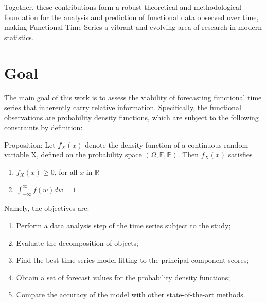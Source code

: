 \documentclass[article]{abntex2}
\begin{document}
Together, these contributions form a robust theoretical and methodological foundation for the analysis and prediction of functional data observed over time, making Functional Time Series a vibrant and evolving area of research in modern statistics.





\section{Goal}
The main goal of this work is to assess the viability of forecasting functional time series that inherently carry relative information. Specifically, the functional observations are probability density functions, which are subject to the following constraints by definition:

Proposition: Let $f_X(x)$ denote the density function of a continuous random variable X,  defined on the probability space $(\Omega, \mathbb{F}, \mathbb{P})$. Then $f_X(x)$ satisfies
\begin{enumerate}
    \item $f_X(x)\geq0$, for all $x$ in $\mathbb{R}$
    \item $\int_{-\infty}^{\infty}f(w)dw=1$
\end{enumerate}

Namely, the objectives are:
\begin{enumerate}
    \item Perform a data analysis step of the time series subject to the study;
    \item Evaluate the decomposition of objects;
    \item Find the best time series model fitting to the principal component scores;
    \item Obtain a set of forecast values for the probability density functions;
    \item Compare the accuracy of the model with other state-of-the-art methods.
\end{enumerate}
\end{document}
